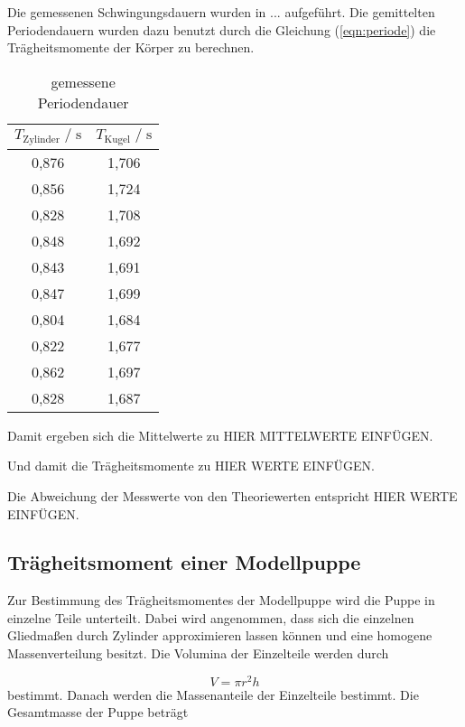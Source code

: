 Die gemessenen Schwingungsdauern wurden in $...$ aufgeführt. Die gemittelten Periodendauern wurden dazu benutzt
durch die Gleichung (\autoref{eqn:periode}) die Trägheitsmomente der Körper zu berechnen.

\begin{table}
  \centering
   \caption{gemessene Periodendauer}
   \label{tab:traegheitsmomente}
   \begin{tabular}{c c}
      \toprule
      $ T_{\text{Zylinder}} \;/\; \si{\second}$ & $ T_{\text{Kugel}} \;/\; \si{\second}$ \\
      \midrule
      0,876 & 1,706 \\
      0,856 & 1,724 \\
      0,828 & 1,708 \\
      0,848 & 1,692 \\
      0,843 & 1,691 \\
      0,847 & 1,699 \\
      0,804 & 1,684 \\
      0,822 & 1,677 \\
      0,862 & 1,697 \\
      0,828 & 1,687 \\
      \bottomrule
   \end{tabular}
\end{table}

Damit ergeben sich die Mittelwerte zu HIER MITTELWERTE EINFÜGEN.

Und damit die Trägheitsmomente zu HIER WERTE EINFÜGEN.

Die Abweichung der Messwerte von den Theoriewerten entspricht HIER WERTE EINFÜGEN.

\subsection{Trägheitsmoment einer Modellpuppe}
\label{sec:Trägheitsmoment einer Modellpuppe}

Zur Bestimmung des Trägheitsmomentes der Modellpuppe wird die Puppe in einzelne Teile unterteilt. Dabei wird angenommen,
dass sich die einzelnen Gliedmaßen durch Zylinder approximieren lassen können und eine homogene Massenverteilung besitzt. Die
Volumina der Einzelteile werden durch

\begin{equation}
  V = \pi r^2h
\end{equation}
bestimmt. Danach werden die Massenanteile der Einzelteile bestimmt. Die Gesamtmasse der Puppe beträgt 

